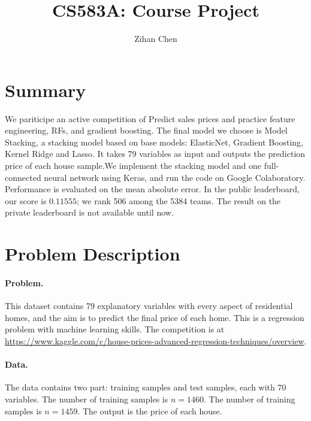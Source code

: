 \documentclass[11pt]{article}
\numberwithin{equation}{section}
\begin{document}
\title{CS583A: Course Project}

\author{Zihan Chen}


\maketitle




\section{Summary}

We pariticipe an active competition of Predict sales prices and practice feature engineering, RFs, and gradient boosting. The final model we choose is Model Stacking, a stacking model based on base models: ElasticNet, Gradient Boosting, Kernel Ridge and Lasso. It takes 79 variables as input and outputs the prediction price of each house sample.We implement the stacking model and one full-connected neural network using Keras, and run the code on Google Colaboratory. Performance is evaluated on the mean absolute error. In the public leaderboard, our score is $0.11555$; we rank 506 among the 5384 teams. The result on the private leaderboard is not available until now.


\section{Problem Description}



\paragraph{Problem.}
This dataset contains 79 explanatory variables with every aspect of residential homes, and the aim is to predict the final price of each home.
This is a regression problem with machine learning skills.
The competition is at \url{https://www.kaggle.com/c/house-prices-advanced-regression-techniques/overview}.



\paragraph{Data.} 
The data contains two part: training samples and test samples, each with 70 variables.
The number of training samples is $n=1460$.
The number of training samples is $n=1459$.
The output is the price of each house.
\end{document}

